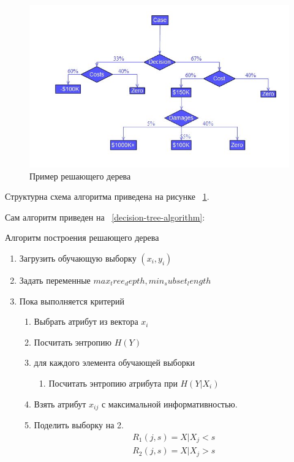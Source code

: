 \begin{figure}
  \centering
  \includegraphics[width=1.0\textwidth]{images/Decision_tree_using_flow_chart_symbols.jpg}
  \caption{Пример решающего дерева\label{decision_tree_schema}}
\end{figure}

Структурна схема алгоритма приведена на рисунке ~\ref{decision_tree_schema}.

Сам алгоритм приведен на ~\ref{decision-tree-algorithm}:

\begin{algorithm}
  \caption{Алгоритм построения решающего дерева}
  \label{decision-tree-algorithm}
  \begin{enumerate}
  \item Загрузить обучающую выборку $(x_i,y_i)$
  \item Задать переменные $max_tree_depth,min_subset_length$
  \item Пока выполняется критерий
  	\begin{enumerate}
  		\item Выбрать атрибут из вектора $x_i$
  		\item Посчитать энтропию $H(Y)$
  		\item для каждого элемента обучающей выборки
  		\begin{enumerate}
  			\item Посчитать энтропию атрибута при $H(Y|X_i)$
  		\end{enumerate}
  		\item Взять атрибут $x_{ij}$ с максимальной информативностью.
  		\item Поделить выборку на 2.
  			\begin{subequations}
  			\begin{align}
  				R_1(j,s)={X|X_j < s} \\
  				R_2(j,s)={X|X_j > s}
  			\end{align}
  			\end{subequations}
  	\end{enumerate}
  \end{enumerate}
\end{algorithm}


